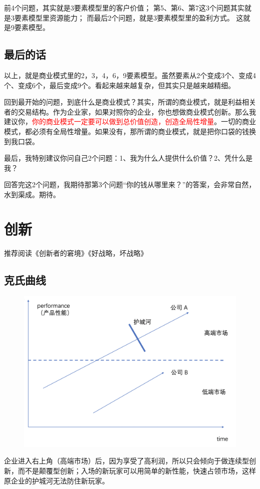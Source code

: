 \documentclass[12pt]{article}
\begin{document}
前4个问题，其实就是3要素模型里的客户价值； 第5、第6、第7这3个问题其实就是3要素模型里资源能力； 而最后2个问题，就是3要素模型里的盈利方式。 这就是9要素模型。

 \subsection{最后的话}
 以上，就是商业模式里的2，3，4，6，9要素模型。虽然要素从2个变成3个、变成4个、变成6个，最后变成9个。看起来越来越复杂，但其实只是越来越精细。

回到最开始的问题，到底什么是商业模式？其实，所谓的商业模式，就是利益相关者的交易结构。作为企业家，如果对照你的企业，你也想做商业模式创新。那么我建议你，\textcolor{red}{你的商业模式一定要可以做到总价值创造，创造全局性增量}。一切的商业模式，都必须有全局性增量。如果没有，那所谓的商业模式，就是把你口袋的钱换到我口袋。

最后，我特别建议你问自己2个问题：1、我为什么人提供什么价值？2、凭什么是我？

回答完这2个问题，我期待那第3个问题“你的钱从哪里来？”的答案，会非常自然，水到渠成。期待。

\section{创新}
推荐阅读《创新者的窘境》《好战略，坏战略》

\subsection{克氏曲线}
\begin{figure}[H]
    \centering
    \includegraphics[width=.6\textwidth]{fig/Ke_Curve.png}
\end{figure}

企业进入右上角（高端市场）后，因为享受了高利润，所以只会倾向于做连续型创新，而不是颠覆型创新；入场的新玩家可以用简单的新性能，快速占领市场，这样原企业的护城河无法防住新玩家。
\end{document}
